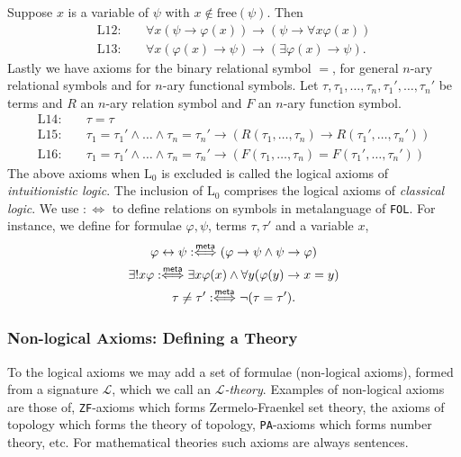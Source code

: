 Suppose $x$ is a variable of $\psi$ with $x\notin\mathrm{free}(\psi)$. Then 
\begin{align*}
    \mathrm{L12}\colon \quad & \forall x(\psi\to \varphi(x))\to (\psi\to \forall x\varphi(x))\\
    \mathrm{L13}\colon \quad & \forall x(\varphi(x)\to \psi)\to (\exists\varphi(x)\to \psi).
\end{align*} 
Lastly we have axioms for the binary relational symbol $=$, for general $n$-ary relational symbols and for $n$-ary functional symbols. Let $\tau,\tau_1,\dots,\tau_n,\tau_1',\dots,\tau_n'$ be terms and $R$ an $n$-ary relation symbol and $F$ an $n$-ary function symbol.
\begin{align*}
    \mathrm{L14}\colon \quad & \tau = \tau\\
    \mathrm{L15}\colon \quad & \tau_1 = \tau_1' \wedge \dots \wedge \tau_n = \tau_n' \to (R(\tau_1,\dots,\tau_n)\to R(\tau_1',\dots,\tau_n'))\\
    \mathrm{L16}\colon \quad & \tau_1 = \tau_1' \wedge \dots \wedge \tau_n = \tau_n' \to (F(\tau_1,\dots,\tau_n)= F(\tau_1',\dots,\tau_n'))  
\end{align*}
The above axioms when $\mathrm{L}_0$ is excluded is called the logical axioms of \emph{intuitionistic logic}. The inclusion of $\mathrm{L}_0$ comprises the logical axioms of \emph{classical logic}.
We use $:\iff$ to define relations on symbols in metalanguage of \verb|FOL|. For instance, we define for formulae $\varphi,\psi$, terms $\tau,\tau'$ and a variable $x$, 
\begin{gather*}
    \varphi \leftrightarrow \psi :\mathrel{\overset{\mathsf{meta}}{\Longleftrightarrow}} (\varphi \to \psi \wedge \psi \to \varphi)\\
    \exists! x\varphi :\mathrel{\overset{\mathsf{meta}}{\Longleftrightarrow}} \exists x\varphi(x) \wedge \forall y(\varphi(y)\to x=y)\\
    \tau \neq \tau' :\mathrel{\overset{\mathsf{meta}}{\Longleftrightarrow}} \neg(\tau = \tau').
\end{gather*}

\subsubsection{Non-logical Axioms: Defining a Theory}
To the logical axioms we may add a set of formulae (non-logical axioms), formed from a signature $\mathcal{L}$, which we call an \emph{$\mathcal{L}$-theory}. Examples of non-logical axioms are those of, \verb|ZF|-axioms which forms Zermelo-Fraenkel set theory, the axioms of topology which forms the theory of topology, \verb|PA|-axioms which forms number theory, etc. For mathematical theories such axioms are always sentences.  
